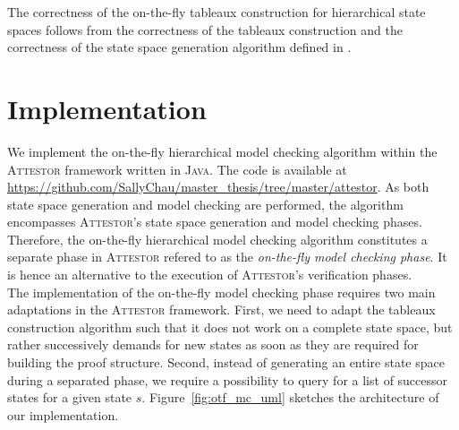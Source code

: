 \documentclass[a4paper, 12pt, twoside]{report}
\begin{document}
	The correctness of the on-the-fly tableaux construction for hierarchical state spaces follows from the correctness of the tableaux construction \cite{bhat1995efficient} and the correctness of the state space generation algorithm defined in \cite{arndt2018let}. 
	
	\section{Implementation}
	
	We implement the on-the-fly hierarchical model checking algorithm within the \textsc{Attestor} framework written in \textsc{Java}. The code is available at \url{https://github.com/SallyChau/master_thesis/tree/master/attestor}. As both state space generation and model checking are performed, the algorithm encompasses \textsc{Attestor}'s state space generation and model checking phases. Therefore, the on-the-fly hierarchical model checking algorithm constitutes a separate phase in \textsc{Attestor} refered to as the \textit{on-the-fly model checking phase}. It is hence an alternative to the execution of \textsc{Attestor}'s verification phases.\\
	
	The implementation of the on-the-fly model checking phase requires two main adaptations in the \textsc{Attestor} framework. First, we need to adapt the tableaux construction algorithm such that it does not work on a complete state space, but rather successively demands for new states as soon as they are required for building the proof structure. Second, instead of generating an entire state space during a separated phase, we require a possibility to query for a list of successor states for a given state $s$. Figure~\ref{fig:otf_mc_uml} sketches the architecture of our implementation.\\
	
\end{document}
